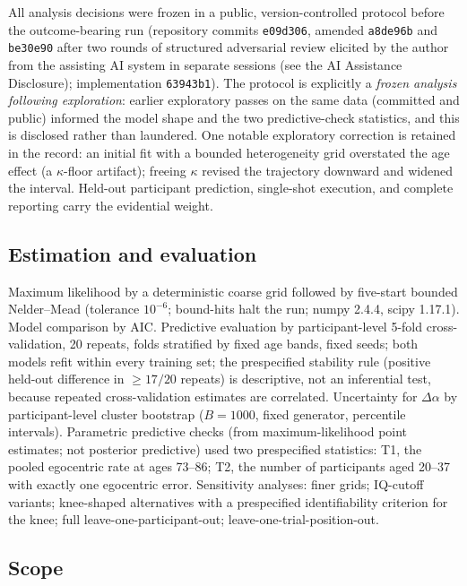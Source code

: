 \documentclass[11pt]{article}
\newcommand{\dalpha}{\ensuremath{\Delta\alpha}}
\begin{document}
All analysis decisions were frozen in a public, version-controlled protocol
before the outcome-bearing run (repository commits \texttt{e09d306}, amended
\texttt{a8de96b} and \texttt{be30e90} after two rounds of structured
adversarial review elicited by the author from the assisting AI system in
separate sessions (see the AI Assistance Disclosure);
implementation \texttt{63943b1}). The protocol is explicitly a \emph{frozen
analysis following exploration}: earlier exploratory passes on the same data
(committed and public) informed the model shape and the two predictive-check
statistics, and this is disclosed rather than laundered. One notable
exploratory correction is retained in the record: an initial fit with a bounded
heterogeneity grid overstated the age effect (a $\kappa$-floor artifact);
freeing $\kappa$ revised the trajectory downward and widened the interval.
Held-out participant prediction, single-shot execution, and complete reporting
carry the evidential weight.

\subsection{Estimation and evaluation}\label{sec:estimation}

Maximum likelihood by a deterministic coarse grid followed by five-start
bounded Nelder--Mead (tolerance $10^{-6}$; bound-hits halt the run; numpy
2.4.4, scipy 1.17.1). Model comparison by AIC. Predictive evaluation by
participant-level 5-fold cross-validation, 20 repeats, folds stratified by
fixed age bands, fixed seeds; both models refit within every training set; the
prespecified stability rule (positive held-out difference in $\geq 17/20$
repeats) is descriptive, not an inferential test, because repeated
cross-validation estimates are correlated. Uncertainty for \dalpha{} by
participant-level cluster bootstrap ($B = 1000$, fixed generator, percentile
intervals). Parametric predictive checks (from maximum-likelihood point
estimates; not posterior predictive) used two prespecified statistics: T1, the
pooled egocentric rate at ages 73--86; T2, the number of participants aged
20--37 with exactly one egocentric error. Sensitivity analyses: finer grids;
IQ-cutoff variants; knee-shaped alternatives with a prespecified
identifiability criterion for the knee; full leave-one-participant-out;
leave-one-trial-position-out.

\subsection{Scope}\label{sec:scope}
\end{document}
